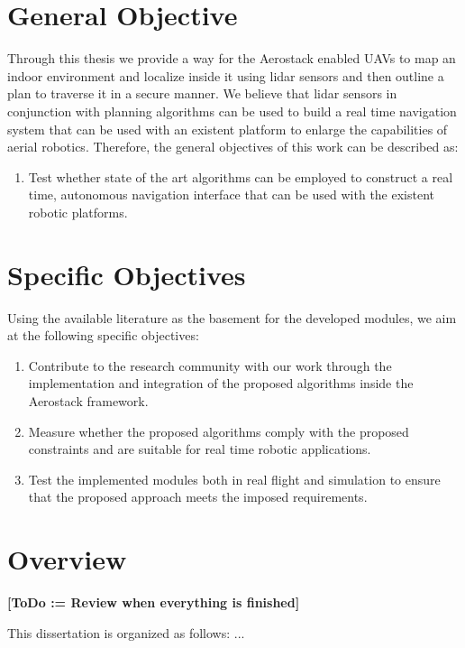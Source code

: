   \section{General Objective}

    Through this thesis we provide a way for the Aerostack enabled UAVs to map an indoor environment and localize inside it using lidar sensors and then outline a plan to traverse it in a secure manner. We believe that lidar sensors in conjunction with planning algorithms can be used to build a real time navigation system that can be used with an existent platform to enlarge the capabilities of aerial robotics. Therefore, the general objectives of this work can be described as:

    \begin{enumerate}
      \item Test whether state of the art algorithms can be employed to construct a real time, autonomous navigation interface that can be used with the existent robotic platforms.
    \end{enumerate}

  \section{Specific Objectives}

    Using the available literature as the basement for the developed modules, we aim at the following specific objectives:

    \begin{enumerate}
      \item Contribute to the research community with our work through the implementation and integration of the proposed algorithms inside the Aerostack framework.
      \item Measure whether the proposed algorithms comply with the proposed constraints and are suitable for real time robotic applications.
      \item Test the implemented modules both in real flight and simulation to ensure that the proposed approach meets the imposed requirements.
    \end{enumerate}

  \section{Overview}

    \textbf{[ToDo := Review when everything is finished]}

    This dissertation is organized as follows: ...

